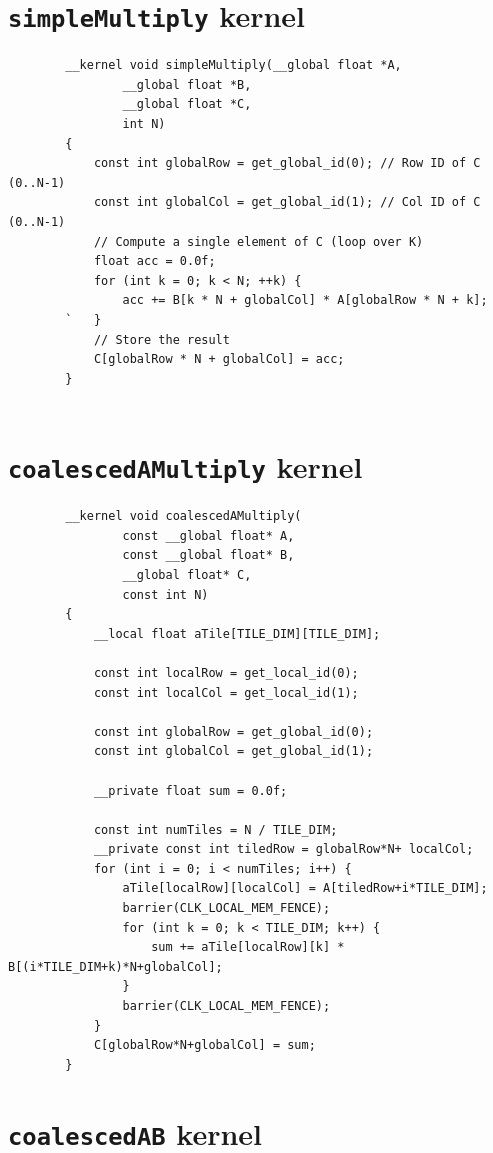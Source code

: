 \documentclass[review=false, sigchi]{acmart}
\begin{document}
	\begin{appendix}
		
		\section{\texttt{simpleMultiply} kernel} \label{simpleMultiply}
		
		\begin{lstlisting}
		__kernel void simpleMultiply(__global float *A,
				__global float *B, 
				__global float *C, 
				int N)
		{
			const int globalRow = get_global_id(0); // Row ID of C (0..N-1)
			const int globalCol = get_global_id(1); // Col ID of C (0..N-1)
			// Compute a single element of C (loop over K)
			float acc = 0.0f;
			for (int k = 0; k < N; ++k) {
				acc += B[k * N + globalCol] * A[globalRow * N + k];
		`	}
			// Store the result
			C[globalRow * N + globalCol] = acc;
		}
		
		\end{lstlisting}
		
		\section{\texttt{coalescedAMultiply} kernel} \label{coalescedAMultiply}

			
		\begin{lstlisting}
		__kernel void coalescedAMultiply(
				const __global float* A,
				const __global float* B,
				__global float* C,
				const int N)
		{
			__local float aTile[TILE_DIM][TILE_DIM];
			
			const int localRow = get_local_id(0);
			const int localCol = get_local_id(1);
			
			const int globalRow = get_global_id(0);
			const int globalCol = get_global_id(1);
			
			__private float sum = 0.0f;
			
			const int numTiles = N / TILE_DIM;
			__private const int tiledRow = globalRow*N+ localCol;
			for (int i = 0; i < numTiles; i++) {
				aTile[localRow][localCol] = A[tiledRow+i*TILE_DIM];
				barrier(CLK_LOCAL_MEM_FENCE);
				for (int k = 0; k < TILE_DIM; k++) {
					sum += aTile[localRow][k] * B[(i*TILE_DIM+k)*N+globalCol];
				}
				barrier(CLK_LOCAL_MEM_FENCE);
			}
			C[globalRow*N+globalCol] = sum;
		}
		\end{lstlisting}

		
		\section{\texttt{coalescedAB} kernel} \label{coalescedABMultiply}
			

\end{appendix}
\end{document}
